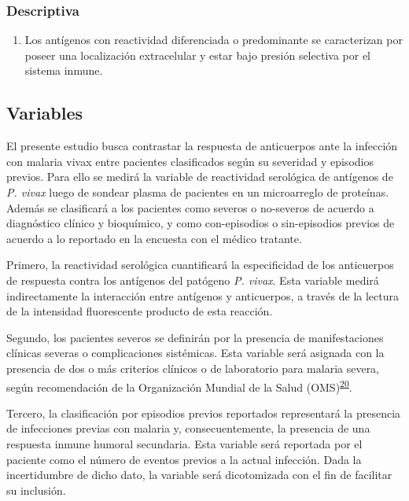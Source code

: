 \documentclass[]{article}
\providecommand{\tightlist}{%
  \setlength{\itemsep}{0pt}\setlength{\parskip}{0pt}}
\begin{document}
\subsubsection{Descriptiva}\label{descriptiva}

\begin{enumerate}
\def\labelenumi{\arabic{enumi}.}
\setcounter{enumi}{2}
\tightlist
\item
  Los antígenos con reactividad diferenciada o predominante se
  caracterizan por poseer una localización extracelular y estar bajo
  presión selectiva por el sistema inmune.
\end{enumerate}

\subsection{Variables}\label{variables}

El presente estudio busca contrastar la respuesta de anticuerpos ante la
infección con malaria vivax entre pacientes clasificados según su
severidad y episodios previos. Para ello se medirá la variable de
reactividad serológica de antígenos de \emph{P. vivax} luego de sondear
plasma de pacientes en un microarreglo de proteínas. Además se
clasificará a los pacientes como severos o no-severos de acuerdo a
diagnóstico clínico y bioquímico, y como con-episodios o sin-episodios
previos de acuerdo a lo reportado en la encuesta con el médico tratante.

Primero, la reactividad serológica cuantificará la especificidad de los
anticuerpos de respuesta contra los antígenos del patógeno \emph{P.
vivax}. Esta variable medirá indirectamente la interacción entre
antígenos y anticuerpos, a través de la lectura de la intensidad
fluorescente producto de esta reacción.

Segundo, los pacientes severos se definirán por la presencia de
manifestaciones clínicas severas o complicaciones sistémicas. Esta
variable será asignada con la presencia de dos o más criterios clínicos
o de laboratorio para malaria severa, según recomendación de la
Organización Mundial de la Salud
(OMS)\textsuperscript{\protect\hyperlink{ref-WHO2014severe}{20}}.

Tercero, la clasificación por episodios previos reportados representará
la presencia de infecciones previas con malaria y, consecuentemente, la
presencia de una respuesta inmune humoral secundaria. Esta variable será
reportada por el paciente como el número de eventos previos a la actual
infección. Dada la incertidumbre de dicho dato, la variable será
dicotomizada con el fin de facilitar su inclusión.
\end{document}
